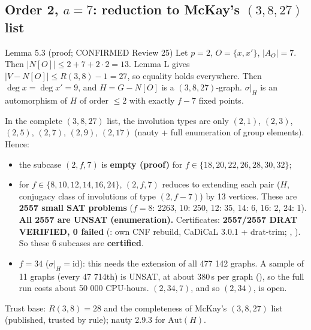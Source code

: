 \subsection{Order 2, \texorpdfstring{$a = 7$}{a = 7}: reduction to McKay's \texorpdfstring{$(3,8,27)$}{(3,8,27)} list}\label{sec:sym-a7}
\begin{namedthm}{Lemma 5.3 (proof; CONFIRMED Review 25)}
Let $p = 2$, $O = \{x, x'\}$, $|A_O| = 7$. Then
$|N[O]| \le 2 + 7 + 2 \cdot 2 = 13$. Lemma L gives $|V - N[O]| \le R(3,8) - 1 = 27$, so equality holds everywhere.
Then $\deg x = \deg x' = 9$, and $H = G - N[O]$ is a $(3,8,27)$-graph. $\sigma|_H$ is an automorphism of $H$ of order $\le 2$
with exactly $f - 7$ fixed points.
\end{namedthm}
In the complete $(3,8,27)$ list, the involution types are only
$(2,1)$, $(2,3)$, $(2,5)$, $(2,7)$, $(2,9)$, $(2,17)$ (nauty + full enumeration of group elements). Hence:
\begin{itemize}
\item the subcase $(2, f, 7)$ is \textbf{empty (proof)} for $f \in \{18, 20, 22, 26, 28, 30, 32\}$;
\item for $f \in \{8, 10, 12, 14, 16, 24\}$, $(2, f, 7)$ reduces to extending each pair ($H$, conjugacy class of
  involutions of type $(2, f-7)$) by 13 vertices. These are \textbf{2557 small SAT problems}
  ($f = 8$: 2263, 10: 250, 12: 35, 14: 6, 16: 2, 24: 1). \textbf{All 2557 are UNSAT (enumeration).}
  Certificates: \textbf{2557/2557 DRAT VERIFIED, 0 failed} (: own CNF rebuild,
  CaDiCaL 3.0.1 + drat-trim; , ). So these 6 subcases are \textbf{certified}.
\item $f = 34$ ($\sigma|_H = \mathrm{id}$): this needs the extension of all 477 142 graphs. A sample of 11 graphs
  (every 47 714th) is UNSAT, at about 380\,s per graph (), so the full run
  costs about 50 000 CPU-hours. $(2,34,7)$, and so $(2,34)$, is open.
\end{itemize}
Trust base: $R(3,8) = 28$ and the completeness of McKay's $(3,8,27)$ list \cite{McZ} (published, trusted by rule);
nauty 2.9.3 for $\mathrm{Aut}(H)$.


